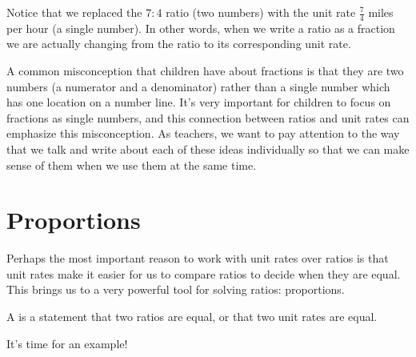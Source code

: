 \documentclass{ximera}
\begin{document}
\begin{example}
Notice that we replaced the $7:4$ ratio (two numbers) with the unit rate $\frac{7}{4}$ miles per hour (a single number). In other words, when we write a ratio as a fraction we are actually changing from the ratio to its corresponding unit rate.
\end{example}

A common misconception that children have about fractions is that they are two numbers (a numerator and a denominator) rather than a single number which has one location on a number line. It's very important for children to focus on fractions as single numbers, and this connection between ratios and unit rates can emphasize this misconception. As teachers, we want to pay attention to the way that we talk and write about each of these ideas individually so that we can make sense of them when we use them at the same time.



\section{Proportions}

Perhaps the most important reason to work with unit rates over ratios is that unit rates make it easier for us to compare ratios to decide when they are equal. This brings us to a very powerful tool for solving ratios: proportions.

\begin{definition}
A  is a statement that two ratios are equal, or that two unit rates are equal. 
\end{definition}

It's time for an example!
\end{document}
